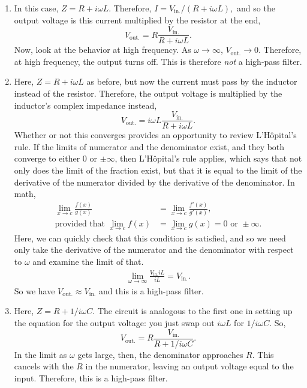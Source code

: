 \documentclass[11pt]{paper}
\begin{document}
\begin{enumerate}[label=\Roman*.]
\item In this case, $Z = R + i\omega L$.  Therefore, $I = V_\text{in.}/\left(R+i\omega L\right),$ and so the output voltage is this current multiplied by the resistor at the end,
\begin{equation}
V_\text{out.} = R\frac{V_\text{in.}}{R+i\omega L}.
\end{equation}
Now, look at the behavior at high frequency.  As $\omega \rightarrow \infty$, $V_\text{out.} \rightarrow 0$.  Therefore, at high frequency, the output turns off.  This is therefore \emph{not} a high-pass filter.

\item Here, $Z = R + i\omega L$ as before, but now the current must pass by the inductor instead of the resistor.  Therefore, the output voltage is multiplied by the inductor's complex impedance instead,
\begin{equation}
V_\text{out.} = i\omega L\frac{V_\text{in.}}{R+i\omega L}. 
\end{equation}
Whether or not this converges provides an opportunity to review L'H\^{o}pital's rule.  If the limits of numerator and the denominator exist, and they both converge to either $0$ or $\pm \infty$, then L'H\^{o}pital's rule applies, which says that not only does the limit of the fraction exist, but that it is equal to the limit of the derivative of the numerator divided by the derivative of the denominator.  In math,
\begin{align}
\lim_{x\rightarrow c} \frac{f(x)}{g(x)} &= \lim_{x\rightarrow c} \frac{f'(x)}{g'(x)},\\
\text{provided that } \lim_{x\rightarrow c} f(x) &= \lim_{x\rightarrow c} g(x) = 0 \text{ or } \pm \infty.
\end{align}
Here, we can quickly check that this condition is satisfied, and so we need only take the derivative of the numerator and the denominator with respect to $\omega$ and examine the limit of that.
\begin{align}
\lim_{\omega\rightarrow \infty} \frac{V_\text{in.} i L}{iL} = V_\text{in.}.
\end{align}
So we have $V_\text{out.} \approx V_\text{in.}$ and this is a high-pass filter.

\item Here, $Z = R + 1/i\omega C$.  The circuit is analogous to the first one in setting up the equation for the output voltage: you just swap out $i \omega L$ for $1/i\omega C$.  So,
\begin{equation}
V_\text{out.} = R\frac{V_\text{in.}}{R+1/i\omega C}.
\end{equation}
In the limit as $\omega$ gets large, then, the denominator approaches $R$.  This cancels with the $R$ in the numerator, leaving an output voltage equal to the input.  Therefore, this is a high-pass filter.


\end{enumerate}
\end{document}
